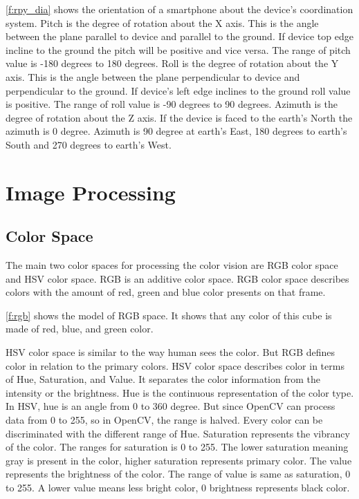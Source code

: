\ref{f:rpy_dia} shows the orientation of a smartphone about the device's coordination system.
Pitch is the degree of rotation about the X axis.
This is the angle between the plane parallel to device and parallel to the ground.
If device top edge incline to the ground the pitch will be positive and vice versa.
The range of pitch value is -180 degrees to 180 degrees.
Roll is the degree of rotation about the Y axis.
This is the angle between the plane perpendicular to device and perpendicular to the ground.
If device's left edge inclines to the ground roll value is positive.
The range of roll value is -90 degrees to 90 degrees.
Azimuth is the degree of rotation about the Z axis.
If the device is faced to the earth's North the azimuth is 0 degree.
Azimuth is 90 degree at earth's East, 180 degrees to earth's South and 270 degrees to earth's West.

\section {Image Processing}

\subsection{Color Space}
The main two color spaces for processing the color vision are RGB color space and HSV color space.
RGB is an additive color space.
RGB color space describes colors with the amount of red, green and blue color presents on that frame.


\ref{f:rgb} shows the model of RGB space.
It shows that any color of this cube is made of red, blue, and green color.

HSV color space is similar to the way human sees the color.
But RGB defines color in relation to the primary colors.
HSV color space describes color in terms of Hue, Saturation, and Value.
It separates the color information from the intensity or the brightness.
Hue is the continuous representation of the color type.
In HSV, hue is an angle from 0 to 360 degree. 
But since OpenCV can process data from 0 to 255, so in OpenCV, the range is halved.
Every color can be discriminated with the different range of Hue.
Saturation represents the vibrancy of the color.
The ranges for saturation is 0 to 255.
The lower saturation meaning gray is present in the color, higher saturation represents primary color.
The value represents the brightness of the color.
The range of value is same as saturation, 0 to 255.
A lower value means less bright color, 0 brightness represents black color.

